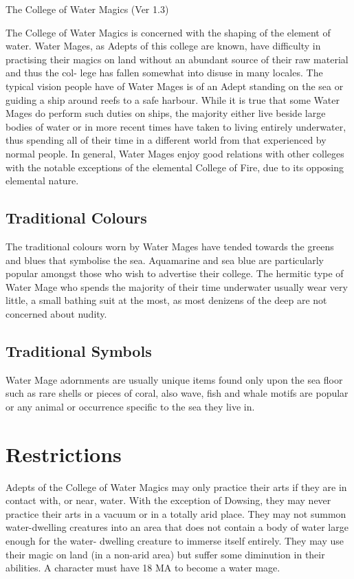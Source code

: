 \begin{Chapter}{The College of Water Magics (Ver 1.3)}

The College of Water Magics is concerned with the shaping of the
element of water.  Water Mages, as Adepts of this college are known,
have difficulty in practising their magics on land without an abundant
source of their raw material and thus the col- lege has fallen
somewhat into disuse in many locales.  The typical vision people have
of Water Mages is of an Adept standing on the sea or guiding a ship
around reefs to a safe harbour. While it is true that some Water Mages
do perform such duties on ships, the majority either live beside large
bodies of water or in more recent times have taken to living entirely
underwater, thus spending all of their time in a different world from
that experienced by normal people.  In general, Water Mages enjoy good
relations with other colleges with the notable exceptions of the
elemental College of Fire, due to its opposing elemental nature.

\subsection{Traditional Colours}

The traditional colours worn by Water Mages have tended towards the
greens and blues that symbolise the sea.  Aquamarine and sea blue are
particularly popular amongst those who wish to advertise their
college.  The hermitic type of Water Mage who spends the majority of
their time underwater usually wear very little, a small bathing suit
at the most, as most denizens of the deep are not concerned about
nudity.

\subsection{Traditional Symbols}

Water Mage adornments are usually unique items found only upon the sea
floor such as rare shells or pieces of coral, also wave, fish and
whale motifs are popular or any animal or occurrence specific to the
sea they live in.

\section{Restrictions}

Adepts of the College of Water Magics may only practice their arts if
they are in contact with, or near, water.  With the exception of
Dowsing, they may never practice their arts in a vacuum or in a
totally arid place.  They may not summon water-dwelling creatures into
an area that does not contain a body of water large enough for the
water- dwelling creature to immerse itself entirely.  They may use
their magic on land (in a non-arid area) but suffer some diminution in
their abilities.  A character must have 18 MA to become a water mage.


\end{Chapter}
